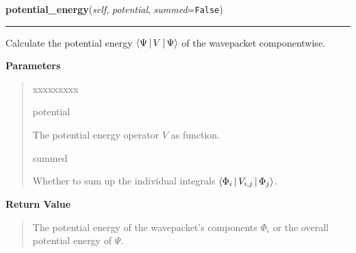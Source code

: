 \hspace{.8\funcindent}\begin{boxedminipage}{\funcwidth}

    \raggedright \textbf{potential\_energy}(\textit{self}, \textit{potential}, \textit{summed}={\tt False})

    \vspace{-1.5ex}

    \rule{\textwidth}{0.5\fboxrule}
\setlength{\parskip}{2ex}
    Calculate the potential energy
    $\Braket{\Psi|V|\Psi}$
    of the wavepacket componentwise.

\setlength{\parskip}{1ex}
      \textbf{Parameters}
      \vspace{-1ex}

      \begin{quote}
        \begin{Ventry}{xxxxxxxxx}

          \item[potential]

          The potential energy operator $V$ as function.

          \item[summed]

          Whether to sum up the individual integrals
          $\Braket{\Phi_i|V_{i,j}|\Phi_j}$.

        \end{Ventry}

      \end{quote}

      \textbf{Return Value}
    \vspace{-1ex}

      \begin{quote}
      The potential energy of the wavepacket's components
      $\Phi_i$ or the overall potential energy of
      $\Psi$.

      \end{quote}

    \end{boxedminipage}

    \label{HagedornMultiWavepacket:HagedornMultiWavepacket:kinetic_energy}

    \vspace{0.5ex}


